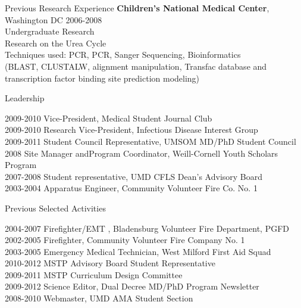 \documentclass{resume} %
\begin{document}
\begin{rSection}{Previous Research Experience}
   {\bf Children’s National Medical Center}{, Washington DC} \hfill {2006-2008}
   \\ 
   Undergraduate Research\\
   Research on the Urea Cycle\\
   Techniques used: PCR, PCR, Sanger Sequencing, Bioinformatics\\ (BLAST, CLUSTALW, alignment manipulation, Transfac database and\\ transcription factor binding site prediction modeling)
   \end{rSection}
   
   \begin{rSection}{Leadership}
     

   2009-2010 \enspace Vice-President, Medical Student Journal Club\\
   2009-2010 \enspace Research Vice-President, Infectious Disease Interest Group\\
   2009-2011 \enspace Student Council Representative, UMSOM MD/PhD Student Council\\
   2008 \hspace{27.5pt} Site Manager andProgram Coordinator, Weill-Cornell Youth Scholars Program\\
   2007-2008 \enspace Student representative, UMD CFLS Dean’s Advisory Board\\
   2003-2004 \enspace Apparatus Engineer, Community Volunteer Fire Co. No. 1
   
   \end{rSection}
   

\begin{rSection}{Previous Selected Activities}

   2004-2007 \enspace Firefighter/EMT , Bladensburg Volunteer Fire Department, PGFD\\
   2002-2005 \enspace Firefighter, Community Volunteer Fire Company No. 1\\
   2003-2005 \enspace Emergency Medical Technician, West Milford First Aid Squad	\\
   2010-2012 \enspace MSTP Advisory Board Student Representative \\
   2009-2011 \enspace MSTP Curriculum Design Committee	\\
   2009-2012 \enspace Science Editor, Dual Decree MD/PhD Program Newsletter         \\
   2008-2010 \enspace Webmaster, UMD AMA Student Section

   
   \end{rSection}
   
\end{document}
